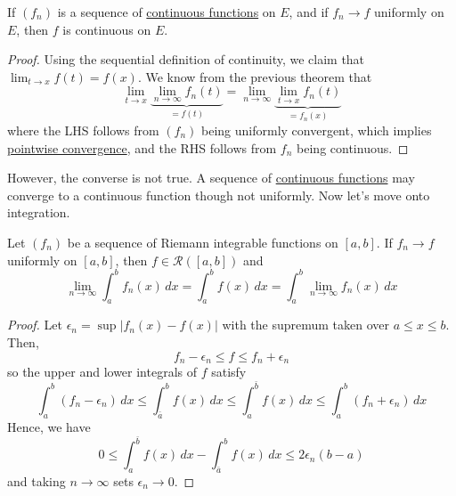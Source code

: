   \begin{corollary}
    \label{thm:uniform-limits-of-continuous-functions-are}
    If $(f_n)$ is a sequence of \hyperref[pst-def:continuous_func]{continuous functions} on $E$, and if $f_n \to f$ uniformly on $E$, then $f$ is continuous on $E$. 
  \end{corollary}
  \begin{proof}
    Using the sequential definition of continuity, we claim that $\lim_{t \to x} f(t) = f(x)$. We know from the previous theorem that 
    \begin{equation}
      \lim_{t \to x} \underbrace{\lim_{n \to \infty} f_n (t)}_{= f(t)} = \lim_{n \to \infty} \underbrace{\lim_{t \to x} f_n (t)}_{= f_n (x)}
    \end{equation}
    where the LHS follows from $(f_n)$ being uniformly convergent, which implies \hyperref[def:pointwise-convergence]{pointwise convergence}, and the RHS follows from $f_n$ being continuous.  
  \end{proof} 

  However, the converse is not true. A sequence of \hyperref[pst-def:continuous_func]{continuous functions} may converge to a continuous function though not uniformly. Now let's move onto integration. 

  \begin{theorem}
    \label{thm:limits-of-integrals-are-integrals-of-uniform}
    Let $(f_n)$ be a sequence of Riemann integrable functions on $[a, b]$. If $f_n \to f$ uniformly on $[a, b]$, then $f \in \mathcal{R}([a, b])$ and 
    \begin{equation}
      \lim_{n \to \infty} \int_a^b f_n(x) \,dx = \int_a^b f(x) \,dx = \int_a^b \lim_{n \to \infty} f_n (x) \,dx 
    \end{equation}
  \end{theorem} 
  \begin{proof}
    Let $\epsilon_n = \sup | f_n (x) - f(x)|$ with the supremum taken over $a \leq x \leq b$. Then, 
    \begin{equation}
      f_n - \epsilon_n \leq f \leq f_n + \epsilon_n
    \end{equation}
    so the upper and lower integrals of $f$ satisfy 
    \begin{equation}
      \int_a^b (f_n - \epsilon_n) \,dx \leq \int_{\bar{a}}^b f(x) \,dx \leq \int_a^{\bar{b}} f(x) \,dx \leq \int_a^b (f_n + \epsilon_n) \,dx
    \end{equation}
    Hence, we have 
    \begin{equation}
      0 \leq \int_a^{\bar{b}} f(x)\,dx - \int_{\bar{a}}^b f(x) \,dx \leq 2 \epsilon_n (b - a) 
    \end{equation}
    and taking $n \to \infty$ sets $\epsilon_n \to 0$. 
  \end{proof}

